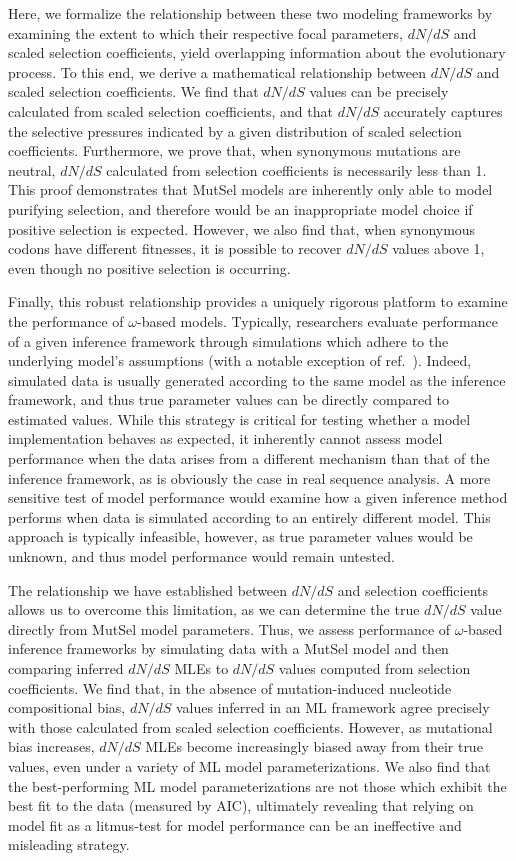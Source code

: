 \documentclass[11pt]{article}
\begin{document}
Here, we formalize the relationship between these two modeling frameworks by examining the extent to which their respective focal parameters, $dN/dS$ and scaled selection coefficients, yield overlapping information about the evolutionary process. To this end, we derive a mathematical relationship between $dN/dS$ and scaled selection coefficients. We find that $dN/dS$ values can be precisely calculated from scaled selection coefficients, and that $dN/dS$ accurately captures the selective pressures indicated by a given distribution of scaled selection coefficients. Furthermore, we prove that, when synonymous mutations are neutral, $dN/dS$ calculated from selection coefficients is necessarily less than 1. This proof demonstrates that MutSel models are inherently only able to model purifying selection, and therefore would be an inappropriate model choice if positive selection is expected. However, we also find that, when synonymous codons have different fitnesses, it is possible to recover $dN/dS$ values above 1, even though no positive selection is occurring. 

Finally, this robust relationship provides a uniquely rigorous platform to examine the performance of $\omega$-based models. Typically, researchers evaluate performance of a given inference framework through simulations which adhere to the underlying model's assumptions (with a notable exception of ref.\ \cite{Holder2008}). Indeed, simulated data is usually generated according to the same model as the inference framework, and thus true parameter values can be directly compared to estimated values. While this strategy is critical for testing whether a model implementation behaves as expected, it inherently cannot assess model performance when the data arises from a different mechanism than that of the inference framework, as is obviously the case in real sequence analysis. A more sensitive test of model performance would examine how a given inference method performs when data is simulated according to an entirely different model. This approach is typically infeasible, however, as true parameter values would be unknown, and thus model performance would remain untested. 

The relationship we have established between $dN/dS$ and selection coefficients allows us to overcome this limitation, as we can determine the true $dN/dS$ value directly from MutSel model parameters. Thus, we assess performance of $\omega$-based inference frameworks by simulating data with a MutSel model and then comparing inferred $dN/dS$ MLEs to $dN/dS$ values computed from selection coefficients. We find that, in the absence of mutation-induced nucleotide compositional bias, $dN/dS$ values inferred in an ML framework agree precisely with those calculated from scaled selection coefficients. However, as mutational bias increases, $dN/dS$ MLEs become increasingly biased away from their true values, even under a variety of ML model parameterizations. We also find that the best-performing ML model parameterizations are not those which exhibit the best fit to the data (measured by AIC), ultimately revealing that relying on model fit as a litmus-test for model performance can be an ineffective and misleading strategy. 
\end{document}
